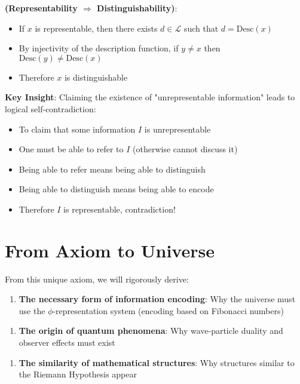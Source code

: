 \textbf{(Representability $\Rightarrow$ Distinguishability)}:
\begin{itemize}
\item If $x$ is representable, then there exists $d \in \mathcal{L}$ such that $d = \text{Desc}(x)$
\item By injectivity of the description function, if $y \neq x$ then $\text{Desc}(y) \neq \text{Desc}(x)$
\item Therefore $x$ is distinguishable
\end{itemize}

\textbf{Key Insight}: Claiming the existence of "unrepresentable information" leads to logical self-contradiction:
\begin{itemize}
\item To claim that some information $I$ is unrepresentable
\item One must be able to refer to $I$ (otherwise cannot discuss it)
\item Being able to refer means being able to distinguish
\item Being able to distinguish means being able to encode
\item Therefore $I$ is representable, contradiction!
\end{itemize}

\section{From Axiom to Universe}
\label{sec:ch03_derivation:from-axiom-to-universe}

From this unique axiom, we will rigorously derive:

\begin{enumerate}
\item \textbf{The necessary form of information encoding}: Why the universe must use the $\phi$-representation system (encoding based on Fibonacci numbers)
\end{enumerate}

\begin{enumerate}
\item \textbf{The origin of quantum phenomena}: Why wave-particle duality and observer effects must exist
\end{enumerate}

\begin{enumerate}
\item \textbf{The similarity of mathematical structures}: Why structures similar to the Riemann Hypothesis appear
\end{enumerate}

